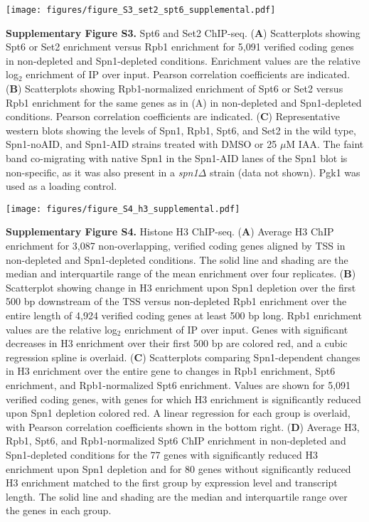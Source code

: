 \documentclass[8pt]{extarticle}
\begin{document}
\newpage


{\texttt{[image: figures/figure\_S3\_set2\_spt6\_supplemental.pdf]}\par}

\vspace{2em}
\textbf{Supplementary Figure S3.} Spt6 and Set2 ChIP-seq.
(\textbf{A}) Scatterplots showing Spt6 or Set2 enrichment versus Rpb1 enrichment for 5,091 verified coding genes in non-depleted and Spn1-depleted conditions.
Enrichment values are the relative log$_2$ enrichment of IP over input.
Pearson correlation coefficients are indicated.
(\textbf{B}) Scatterplots showing Rpb1-normalized enrichment of Spt6 or Set2 versus Rpb1 enrichment for the same genes as in (A) in non-depleted and Spn1-depleted conditions.
Pearson correlation coefficients are indicated.
(\textbf{C}) Representative western blots showing the levels of Spn1, Rpb1, Spt6, and Set2 in the wild type, Spn1-noAID, and Spn1-AID strains treated with DMSO or 25 $\mu$M IAA.
The faint band co-migrating with native Spn1 in the Spn1-AID lanes of the Spn1 blot is non-specific, as it was also present in a \textit{spn1$\Delta$} strain (data not shown).
Pgk1 was used as a loading control.

\newpage


{\texttt{[image: figures/figure\_S4\_h3\_supplemental.pdf]}\par}

\vspace{2em}
\textbf{Supplementary Figure S4.} Histone H3 ChIP-seq.
(\textbf{A}) Average H3 ChIP enrichment for 3,087 non-overlapping, verified coding genes aligned by TSS in non-depleted and Spn1-depleted conditions.
The solid line and shading are the median and interquartile range of the mean enrichment over four replicates.
(\textbf{B}) Scatterplot showing change in H3 enrichment upon Spn1 depletion over the first 500 bp downstream of the TSS versus non-depleted Rpb1 enrichment over the entire length of 4,924 verified coding genes at least 500 bp long.
Rpb1 enrichment values are the relative log$_2$ enrichment of IP over input.
Genes with significant decreases in H3 enrichment over their first 500 bp are colored red, and a cubic regression spline is overlaid.
(\textbf{C}) Scatterplots comparing Spn1-dependent changes in H3 enrichment over the entire gene to changes in Rpb1 enrichment, Spt6 enrichment, and Rpb1-normalized Spt6 enrichment.
Values are shown for 5,091 verified coding genes, with genes for which H3 enrichment is significantly reduced upon Spn1 depletion colored red.
A linear regression for each group is overlaid, with Pearson correlation coefficients shown in the bottom right.
(\textbf{D}) Average H3, Rpb1, Spt6, and Rpb1-normalized Spt6 ChIP enrichment in non-depleted and Spn1-depleted conditions for the 77 genes with significantly reduced H3 enrichment upon Spn1 depletion and for 80 genes without significantly reduced H3 enrichment matched to the first group by expression level and transcript length.
The solid line and shading are the median and interquartile range over the genes in each group.
\end{document}
